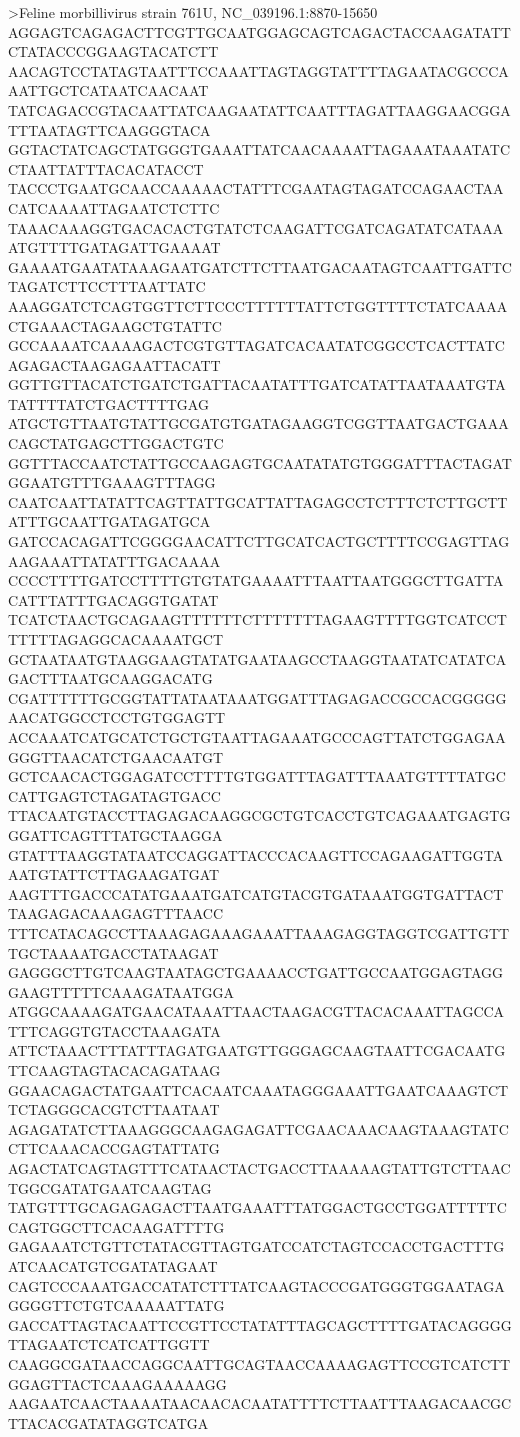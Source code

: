 >Feline morbillivirus strain 761U, NC_039196.1:8870-15650
AGGAGTCAGAGACTTCGTTGCAATGGAGCAGTCAGACTACCAAGATATTCTATACCCGGAAGTACATCTT
AACAGTCCTATAGTAATTTCCAAATTAGTAGGTATTTTAGAATACGCCCAAATTGCTCATAATCAACAAT
TATCAGACCGTACAATTATCAAGAATATTCAATTTAGATTAAGGAACGGATTTAATAGTTCAAGGGTACA
GGTACTATCAGCTATGGGTGAAATTATCAACAAAATTAGAAATAAATATCCTAATTATTTACACATACCT
TACCCTGAATGCAACCAAAAACTATTTCGAATAGTAGATCCAGAACTAACATCAAAATTAGAATCTCTTC
TAAACAAAGGTGACACACTGTATCTCAAGATTCGATCAGATATCATAAAATGTTTTGATAGATTGAAAAT
GAAAATGAATATAAAGAATGATCTTCTTAATGACAATAGTCAATTGATTCTAGATCTTCCTTTAATTATC
AAAGGATCTCAGTGGTTCTTCCCTTTTTTATTCTGGTTTTCTATCAAAACTGAAACTAGAAGCTGTATTC
GCCAAAATCAAAAGACTCGTGTTAGATCACAATATCGGCCTCACTTATCAGAGACTAAGAGAATTACATT
GGTTGTTACATCTGATCTGATTACAATATTTGATCATATTAATAAATGTATATTTTATCTGACTTTTGAG
ATGCTGTTAATGTATTGCGATGTGATAGAAGGTCGGTTAATGACTGAAACAGCTATGAGCTTGGACTGTC
GGTTTACCAATCTATTGCCAAGAGTGCAATATATGTGGGATTTACTAGATGGAATGTTTGAAAGTTTAGG
CAATCAATTATATTCAGTTATTGCATTATTAGAGCCTCTTTCTCTTGCTTATTTGCAATTGATAGATGCA
GATCCACAGATTCGGGGAACATTCTTGCATCACTGCTTTTCCGAGTTAGAAGAAATTATATTTGACAAAA
CCCCTTTTGATCCTTTTGTGTATGAAAATTTAATTAATGGGCTTGATTACATTTATTTGACAGGTGATAT
TCATCTAACTGCAGAAGTTTTTTCTTTTTTTAGAAGTTTTGGTCATCCTTTTTTAGAGGCACAAAATGCT
GCTAATAATGTAAGGAAGTATATGAATAAGCCTAAGGTAATATCATATCAGACTTTAATGCAAGGACATG
CGATTTTTTGCGGTATTATAATAAATGGATTTAGAGACCGCCACGGGGGAACATGGCCTCCTGTGGAGTT
ACCAAATCATGCATCTGCTGTAATTAGAAATGCCCAGTTATCTGGAGAAGGGTTAACATCTGAACAATGT
GCTCAACACTGGAGATCCTTTTGTGGATTTAGATTTAAATGTTTTATGCCATTGAGTCTAGATAGTGACC
TTACAATGTACCTTAGAGACAAGGCGCTGTCACCTGTCAGAAATGAGTGGGATTCAGTTTATGCTAAGGA
GTATTTAAGGTATAATCCAGGATTACCCACAAGTTCCAGAAGATTGGTAAATGTATTCTTAGAAGATGAT
AAGTTTGACCCATATGAAATGATCATGTACGTGATAAATGGTGATTACTTAAGAGACAAAGAGTTTAACC
TTTCATACAGCCTTAAAGAGAAAGAAATTAAAGAGGTAGGTCGATTGTTTGCTAAAATGACCTATAAGAT
GAGGGCTTGTCAAGTAATAGCTGAAAACCTGATTGCCAATGGAGTAGGGAAGTTTTTCAAAGATAATGGA
ATGGCAAAAGATGAACATAAATTAACTAAGACGTTACACAAATTAGCCATTTCAGGTGTACCTAAAGATA
ATTCTAAACTTTATTTAGATGAATGTTGGGAGCAAGTAATTCGACAATGTTCAAGTAGTACACAGATAAG
GGAACAGACTATGAATTCACAATCAAATAGGGAAATTGAATCAAAGTCTTCTAGGGCACGTCTTAATAAT
AGAGATATCTTAAAGGGCAAGAGAGATTCGAACAAACAAGTAAAGTATCCTTCAAACACCGAGTATTATG
AGACTATCAGTAGTTTCATAACTACTGACCTTAAAAAGTATTGTCTTAACTGGCGATATGAATCAAGTAG
TATGTTTGCAGAGAGACTTAATGAAATTTATGGACTGCCTGGATTTTTCCAGTGGCTTCACAAGATTTTG
GAGAAATCTGTTCTATACGTTAGTGATCCATCTAGTCCACCTGACTTTGATCAACATGTCGATATAGAAT
CAGTCCCAAATGACCATATCTTTATCAAGTACCCGATGGGTGGAATAGAGGGGTTCTGTCAAAAATTATG
GACCATTAGTACAATTCCGTTCCTATATTTAGCAGCTTTTGATACAGGGGTTAGAATCTCATCATTGGTT
CAAGGCGATAACCAGGCAATTGCAGTAACCAAAAGAGTTCCGTCATCTTGGAGTTACTCAAAGAAAAAGG
AAGAATCAACTAAAATAACAACACAATATTTTCTTAATTTAAGACAACGCTTACACGATATAGGTCATGA
